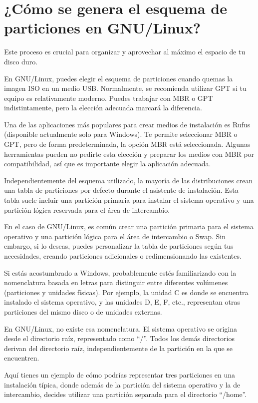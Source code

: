 \documentclass[
  jou,
  floatsintext,
  longtable,
  a4paper,
  nolmodern,
  notxfonts,
  notimes,
  colorlinks=true,linkcolor=blue,citecolor=blue,urlcolor=blue]{apa7}
\begin{document}
\section{¿Cómo se genera el esquema de particiones en
GNU/Linux?}\label{cuxf3mo-se-genera-el-esquema-de-particiones-en-gnulinux}

Este proceso es crucial para organizar y aprovechar al máximo el espacio
de tu disco duro.

En GNU/Linux, puedes elegir el esquema de particiones cuando quemas la
imagen ISO en un medio USB. Normalmente, se recomienda utilizar GPT si
tu equipo es relativamente moderno. Puedes trabajar con MBR o GPT
indistintamente, pero la elección adecuada marcará la diferencia.

Una de las aplicaciones más populares para crear medios de instalación
es Rufus (disponible actualmente solo para Windows). Te permite
seleccionar MBR o GPT, pero de forma predeterminada, la opción MBR está
seleccionada. Algunas herramientas pueden no pedirte esta elección y
preparar los medios con MBR por compatibilidad, así que es importante
elegir la aplicación adecuada.

Independientemente del esquema utilizado, la mayoría de las
distribuciones crean una tabla de particiones por defecto durante el
asistente de instalación. Esta tabla suele incluir una partición
primaria para instalar el sistema operativo y una partición lógica
reservada para el área de intercambio.

En el caso de GNU/Linux, es común crear una partición primaria para el
sistema operativo y una partición lógica para el área de intercambio o
Swap. Sin embargo, si lo deseas, puedes personalizar la tabla de
particiones según tus necesidades, creando particiones adicionales o
redimensionando las existentes.

Si estás acostumbrado a Windows, probablemente estés familiarizado con
la nomenclatura basada en letras para distinguir entre diferentes
volúmenes (particiones y unidades físicas). Por ejemplo, la unidad C es
donde se encuentra instalado el sistema operativo, y las unidades D, E,
F, etc., representan otras particiones del mismo disco o de unidades
externas.

En GNU/Linux, no existe esa nomenclatura. El sistema operativo se
origina desde el directorio raíz, representado como ``/''. Todos los
demás directorios derivan del directorio raíz, independientemente de la
partición en la que se encuentren.

Aquí tienes un ejemplo de cómo podrías representar tres particiones en
una instalación típica, donde además de la partición del sistema
operativo y la de intercambio, decides utilizar una partición separada
para el directorio ``/home''.
\end{document}
